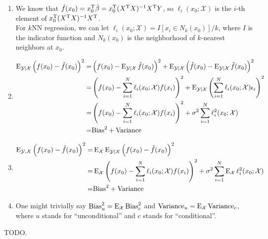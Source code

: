 \begin{sol}
\begin{enumerate}[label={(\alph*)}]
\item 
We know that $\hat{f}(x_0)=x_0^{\mathrm{T}}\hat{\beta}=x_0^{\mathrm{T}}(X^{\mathrm{T}}X)^{-1}X^{\mathrm{T}}Y$, so $\ell_i(x_0;\mathcal{X})$ is the $i$-th element of $x_0^{\mathrm{T}}(X^{\mathrm{T}}X)^{-1}X^{\mathrm{T}}$.\\
For $k$NN regression, we can let $\ell_i(x_0;\mathcal{X})=I[x_i\in N_k(x_0)]/k$, where $I$ is the indicator function and $N_k(x_0)$ is the neighborhood of $k$-nearest neighbors at $x_0$.

\item
\begin{align*}
\operatorname{E}_{\mathcal{Y}\vert\mathcal{X}}\left(f(x_0)-\hat{f}(x_0)\right)^2 =& \left(f(x_0)-\operatorname{E}_{\mathcal{Y}\vert\mathcal{X}}\hat{f}(x_0)\right)^2+\operatorname{E}_{\mathcal{Y}\vert\mathcal{X}}\left(\hat{f}(x_0)-\operatorname{E}_{\mathcal{Y}\vert\mathcal{X}}\hat{f}(x_0)\right)^2 \\
=& \left(f(x_0)-\sum_{i=1}^N\ell_i(x_0;\mathcal{X})f(x_i)\right)^2 + \operatorname{E}_{\mathcal{Y}\vert\mathcal{X}}\left(\sum_{i=1}^N\ell_i(x_0;\mathcal{X})\epsilon_i\right)^2 \\
=& \left(f(x_0)-\sum_{i=1}^N\ell_i(x_0;\mathcal{X})f(x_i)\right)^2 + \sigma^2\sum_{i=1}^N\ell_i^2(x_0;\mathcal{X})\\
=& \mathrm{Bias}^2+\mathrm{Variance}
\end{align*}

\item
\begin{align*}
\operatorname{E}_{\mathcal{Y},\mathcal{X}}\left(f(x_0)-\hat{f}(x_0)\right)^2 =& \operatorname{E}_{\mathcal{X}}\operatorname{E}_{\mathcal{Y}\vert\mathcal{X}}\left(f(x_0)-\hat{f}(x_0)\right)^2 \\
=& \operatorname{E}_{\mathcal{X}}\left(f(x_0)-\sum_{i=1}^N\ell_i(x_0;\mathcal{X})f(x_i)\right)^2 + \sigma^2 \sum_{i=1}^N\operatorname{E}_{\mathcal{X}}\ell_i^2(x_0;\mathcal{X}) \\
=& \mathrm{Bias}^2+\mathrm{Variance}
\end{align*}
\item One might trivially say $\mathrm{Bias}^2_{u}=\operatorname{E}_\mathcal{X}\mathrm{Bias}^2_{c}$ and $\mathrm{Variance}_{u}=\operatorname{E}_\mathcal{X}\mathrm{Variance}_{c}$, where $u$ stands for ``unconditional'' and $c$ stands for ``conditional''.
\end{enumerate}
\end{sol}

\begin{sol}
TODO.
\end{sol}

